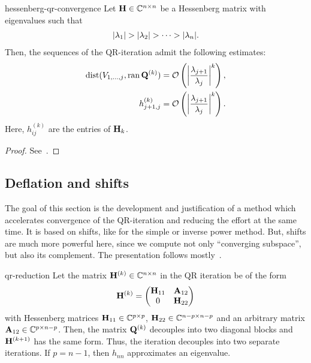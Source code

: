 \begin{Theorem}{hessenberg-qr-convergence}
    Let $\matH\in\Cnn$ be a Hessenberg matrix with eigenvalues such that
  \begin{gather}
    \abs{\lambda_1} >
    \abs{\lambda_2}>\dots>\abs{\lambda_n}.
  \end{gather}
  Then, the sequences of the QR-iteration admit the following estimates:
  \begin{align}
    \dist(\esp{1,\dots,j},\ran{\matq^{(k)}}) &= \bigo \left(\abs*{\frac{\lambda_{j+1}}{\lambda_j}}^k\right),
    \\
    h_{j+1,j}^{(k)} &= \bigo \left(\abs*{\frac{\lambda_{j+1}}{\lambda_j}}^k\right)
                      .
  \end{align}
  Here, $h_{ij}^{(k)}$ are the entries of $\matH_k$.
\end{Theorem}

\begin{proof}
  See~\cite[Theorem 7.3-1]{GolubVanLoan83}.
\end{proof}

\subsection{Deflation and shifts}

\begin{intro}
  The goal of this section is the development and justification of a
  method which accelerates convergence of the QR-iteration and
  reducing the effort at the same time. It is based on shifts, like
  for the simple or inverse power method. But, shifts are much more
  powerful here, since we compute not only ``converging subspace'',
  but also its complement. The presentation follows
  mostly~\cite{GolubVanLoan83}.
\end{intro}

\begin{Theorem}{qr-reduction}
  Let the matrix $\matH^{(k)}\in\Cnn$ in the QR iteration be of the
  form
  \begin{gather}
    \matH^{(k)} =
    \begin{pmatrix}
      \matH_{11} & \mata_{12}\\0 & \matH_{22}
    \end{pmatrix}
  \end{gather}
  with Hessenberg matrices $\matH_{11}\in\C^{p\times p}$,
  $\matH_{22}\in \C^{n-p\times n-p}$ and an arbitrary matrix
  $\mata_{12}\in \C^{p\times n-p}$. Then, the matrix $\matq^{(k)}$
  decouples into two diagonal blocks and $\matH^{(k+1)}$ has the same
  form. Thus, the iteration decouples into two separate iterations. If
  $p=n-1$, then $h_{nn}$ approximates an eigenvalue.
\end{Theorem}

